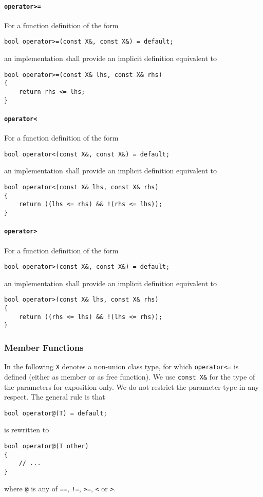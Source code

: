 ﻿\documentclass[a4paper,11pt,final]{article}
\numberwithin{equation}{subsection}
\begin{document}
\paragraph{\texttt{operator>=}}
For a function definition of the form
\begin{verbatim}
bool operator>=(const X&, const X&) = default;
\end{verbatim}
an implementation shall provide an implicit definition equivalent to
\begin{verbatim}
bool operator>=(const X& lhs, const X& rhs)
{
    return rhs <= lhs;
}
\end{verbatim}

\paragraph{\texttt{operator<}}
For a function definition of the form
\begin{verbatim}
bool operator<(const X&, const X&) = default;
\end{verbatim}
an implementation shall provide an implicit definition equivalent to
\begin{verbatim}
bool operator<(const X& lhs, const X& rhs)
{
    return ((lhs <= rhs) && !(rhs <= lhs));
}
\end{verbatim}

\paragraph{\texttt{operator>}}
For a function definition of the form
\begin{verbatim}
bool operator>(const X&, const X&) = default;
\end{verbatim}
an implementation shall provide an implicit definition equivalent to
\begin{verbatim}
bool operator>(const X& lhs, const X& rhs)
{
    return ((rhs <= lhs) && !(lhs <= rhs));
}
\end{verbatim}

\subsubsection{Member Functions}
In the following \verb|X| denotes a non-union class type, for which \verb|operator<=| is defined (either as member or as free function). We use \verb|const X&| for the type of the parameters for exposition only. We do not restrict the parameter type in any respect. The general rule is that
\begin{verbatim}
bool operator@(T) = default;
\end{verbatim}
is rewritten to
\begin{verbatim}
bool operator@(T other)
{
    // ...
}
\end{verbatim}
where \verb|@| is any of \verb|==|, \verb|!=|, \verb|>=|, \verb|<| or \verb|>|.
\end{document}
